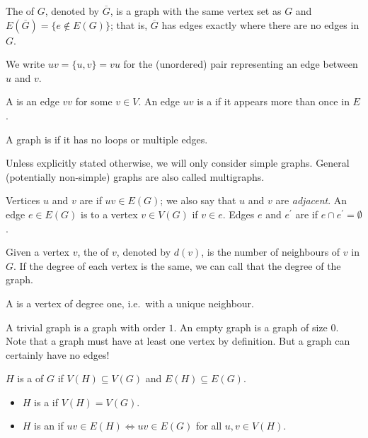 \begin{definition}
The  of $G$, denoted by $\overline{G}$, is a graph with the same vertex set as $G$ and $E(\overline{G}) = \{e \notin E(G)\}$; that is, $\overline{G}$ has edges exactly where there are no edges in $G$.
\end{definition}

\begin{notation}
We write $uv=\{u,v\}=vu$ for the (unordered) pair representing an edge between $u$ and $v$.
\end{notation}

\begin{definition}
A  is an edge $vv$ for some $v \in V$. An edge $uv$ is a  if it appears more than once in $E$. 

A graph is  if it has no loops or multiple edges.
\end{definition}

\begin{remark}
Unless explicitly stated otherwise, we will only consider simple graphs. General (potentially non-simple) graphs are also called multigraphs.
\end{remark}

\begin{definition}
Vertices $u$ and $v$ are  if $uv\in E(G)$; we also say that $u$ and $v$ are \emph{adjacent}. An edge $e\in E(G)$ is  to a vertex $v \in V(G)$ if $v\in e$. Edges $e$ and $e^\prime$ are  if $e\cap e^\prime=\emptyset$.
\end{definition}

\begin{definition}
Given a vertex $v$, the  of $v$, denoted by $d(v)$, is the number of neighbours of $v$ in $G$. If the degree of each vertex is the same, we can call that the degree of the graph.

A  is a vertex of degree one, i.e.\ with a unique neighbour.
\end{definition}

\begin{remark}
A trivial graph is a graph with order $1$. An empty graph is a graph of size $0$. Note that a graph must have at least one vertex by definition. But a graph can certainly have no edges!
\end{remark}

\begin{definition}[Subgraph]
$H$ is a  of $G$ if $V(H) \subseteq V(G)$ and $E(H) \subseteq E(G)$.
\begin{itemize}
\item $H$ is a  if $V(H)=V(G)$.
\item $H$ is an  if $uv\in E(H)\iff uv\in E(G)$ for all $u,v\in V(H)$.
\end{itemize}
\end{definition}

